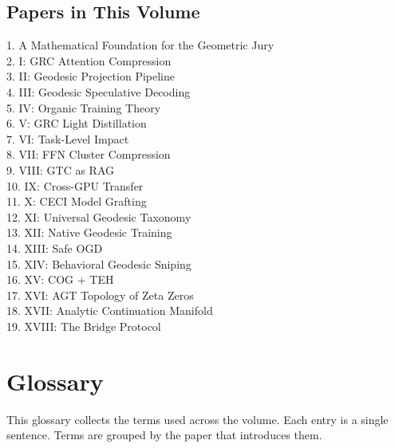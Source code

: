 \documentclass[11pt]{article}
\begin{document}
\newpage
\subsection*{Papers in This Volume}

1. A Mathematical Foundation for the Geometric Jury \\
2. I: GRC Attention Compression \\
3. II: Geodesic Projection Pipeline \\
4. III: Geodesic Speculative Decoding \\
5. IV: Organic Training Theory \\
6. V: GRC Light Distillation \\
7. VI: Task-Level Impact \\
8. VII: FFN Cluster Compression \\
9. VIII: GTC as RAG \\
10. IX: Cross-GPU Transfer \\
11. X: CECI Model Grafting \\
12. XI: Universal Geodesic Taxonomy \\
13. XII: Native Geodesic Training \\
14. XIII: Safe OGD \\
15. XIV: Behavioral Geodesic Sniping \\
16. XV: COG + TEH \\
17. XVI: AGT Topology of Zeta Zeros \\
18. XVII: Analytic Continuation Manifold \\
19. XVIII: The Bridge Protocol \\

\newpage
\section*{Glossary}

This glossary collects the terms used across the volume. Each entry is a
single sentence. Terms are grouped by the paper that introduces them.
\end{document}
